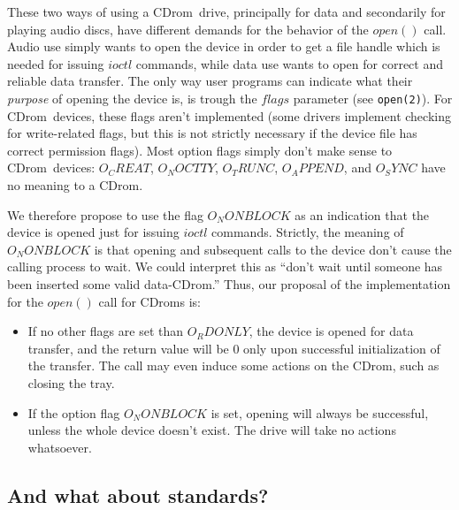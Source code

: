 \documentclass{article}
\def\cdrom{{\sc CDrom}}
\begin{document}
These two ways of using a \cdrom\ drive, principally for data and
secondarily for playing audio discs, have different demands for the
behavior of the $open()$ call. Audio use simply wants to open the
device in order to get a file handle which is needed for issuing
$ioctl$ commands, while data use wants to open for correct and
reliable data transfer. The only way user programs can indicate what
their {\em purpose\/} of opening the device is, is trough the $flags$
parameter (see {\tt open(2)}). For \cdrom\ devices, these flags aren't
implemented (some drivers implement checking for write-related flags,
but this is not strictly necessary if the device file has correct
permission flags). Most option flags simply don't make sense to
\cdrom\ devices: $O_CREAT$, $O_NOCTTY$, $O_TRUNC$, $O_APPEND$, and
$O_SYNC$ have no meaning to a \cdrom. 

We therefore propose to use the flag $O_NONBLOCK$ as an indication
that the device is opened just for issuing $ioctl$
commands. Strictly, the meaning of $O_NONBLOCK$ is that opening and
subsequent calls to the device don't cause the calling process to
wait. We could interpret this as ``don't wait until someone has been
inserted some valid data-\cdrom.'' Thus, our proposal of the
implementation for the $open()$ call for \cdrom s is:
\begin{itemize}
\item If no other flags are set than $O_RDONLY$, the device is opened
for data transfer, and the return value will be 0 only upon successful
initialization of the transfer. The call may even induce some actions
on the \cdrom, such as closing the tray.  
\item If the option flag $O_NONBLOCK$ is set, opening will always be
successful, unless the whole device doesn't exist. The drive will take
no actions whatsoever. 
\end{itemize}

\subsection{And what about standards?}
\end{document}
